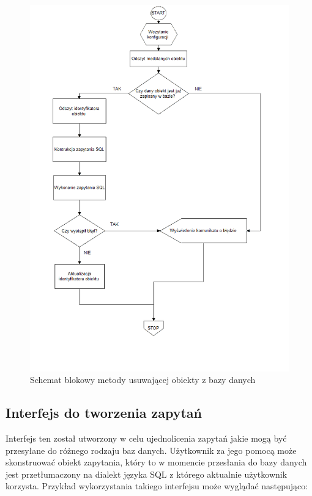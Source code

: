 \documentclass[12pt]{report}
\begin{document}
\begin{figure}[H]
\centering
\includegraphics[width=\textwidth]{resources/remove_schema.png}
\caption{Schemat blokowy metody usuwającej obiekty z bazy danych}
\end{figure}

\newpage

\subsection{Interfejs do tworzenia zapytań}

Interfejs ten został utworzony w celu ujednolicenia zapytań jakie mogą być przesyłane do różnego rodzaju baz danych. Użytkownik za jego pomocą może skonstruować
obiekt zapytania, który to w momencie przesłania do bazy danych jest przetłumaczony na dialekt języka SQL z którego aktualnie użytkownik korzysta. Przykład wykorzystania
takiego interfejsu może wyglądać następująco:
\end{document}
